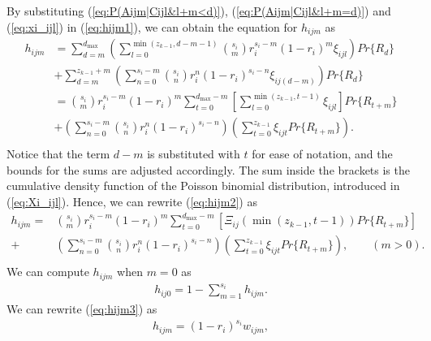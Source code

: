 \documentclass[11pt]{article}\topmargin 0mm
\begin{document}
By substituting (\ref{eq:P(Aijm|Cijl&l+m<d)}),
(\ref{eq:P(Aijm|Cijl&l+m=d)}) and (\ref{eq:xi_ijl}) in
(\ref{eq:hijm1}), we can obtain the equation for $h_{ijm}$ as
\begin{equation}
\label{eq:hijm2}
\begin{split}
h_{ijm} & = \sum_{d=m}^{d_{\max}} \left( \sum_{l=0}^{\min(z_{k-1},d-m-1)} {s_i \choose m} r_i^{s_i-m}(1-r_i)^m \xi_{ijl} \right) Pr\{R_d\} \\
& + \sum_{d=m}^{z_{k-1}+m} \left( \sum_{n=0}^{s_i-m} {s_i \choose n} r_i^n (1-r_i)^{s_i-n} \xi_{ij(d-m)} \right) Pr\{R_d\} \\
& = {s_i \choose m} r_i^{s_i-m}(1-r_i)^m \sum_{t=0}^{d_{\max}-m} \left[ \sum_{l=0}^{\min(z_{k-1},t-1)} \xi_{ijl} \right] Pr\{R_{t+m}\} \\
& + \left( \sum_{n=0}^{s_i-m} {s_i \choose n} r_i^n (1-r_i)^{s_i-n} \right) \left( \sum_{t=0}^{z_{k-1}} \xi_{ijt} Pr\{R_{t+m}\} \right). \\
\end{split}
\end{equation}
Notice that the term $d-m$ is substituted with $t$ for ease of
notation, and the bounds for the sums are adjusted accordingly.
The sum inside the brackets is the cumulative density function
of the Poisson binomial distribution, introduced in
(\ref{eq:Xi_ijl}). Hence, we can rewrite (\ref{eq:hijm2}) as
\begin{equation}
\label{eq:hijm3}
\begin{split}
h_{ijm} = & {s_i \choose m} r_i^{s_i-m}(1-r_i)^m \sum_{t=0}^{d_{\max}-m} \left[ \Xi_{ij}(\min(z_{k-1},t-1)) Pr\{R_{t+m}\} \right] \\
+ & \left( \sum_{n=0}^{s_i-m} {s_i \choose n} r_i^n (1-r_i)^{s_i-n} \right) \left( \sum_{t=0}^{z_{k-1}} \xi_{ijt} Pr\{R_{t+m}\} \right), \qquad (m>0). \\
\end{split}
\end{equation}
We can compute $h_{ijm}$ when $m=0$ as
\begin{equation}
\label{eq:hij0}
\begin{split}
h_{ij0} = 1-\sum_{m=1}^{s_i} h_{ijm}.
\end{split}
\end{equation}
We can rewrite (\ref{eq:hijm3}) as
\begin{equation}
\label{eq:hijm4}
\begin{split}
h_{ijm} = (1-r_i)^{s_i} w_{ijm}, \\
\end{split}
\end{equation}
\end{document}
